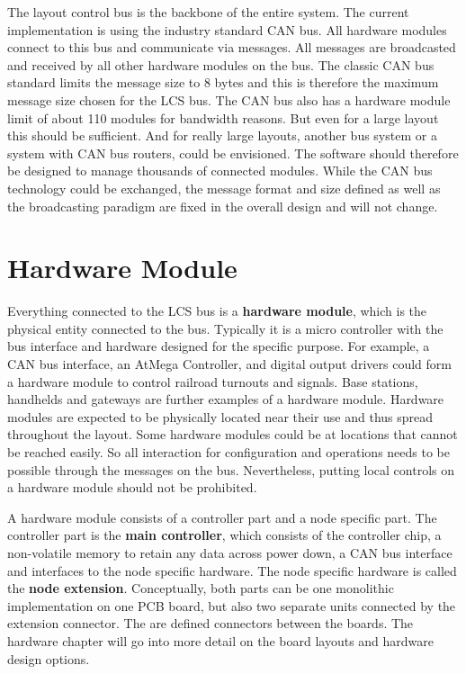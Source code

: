 The layout control bus is the backbone of the entire system. The current implementation is using the industry standard CAN bus. All hardware modules connect to this bus and communicate via messages. All messages are broadcasted and received by all other hardware modules on the bus. The classic CAN bus standard limits the message size to 8 bytes and this is therefore the maximum message size chosen for the LCS bus. The CAN bus also has a hardware module limit of about 110 modules for bandwidth reasons. But even for a large layout this should be sufficient. And for really large layouts, another bus system or a system with CAN bus routers, could be envisioned. The software should therefore be designed to manage thousands of connected modules. While the CAN bus technology could be exchanged, the message format and size defined as well as the broadcasting paradigm are fixed in the overall design and will not change.

\section{Hardware Module}

Everything connected to the LCS bus is a {\bf hardware module}, which is the physical entity connected to the bus. Typically it is a micro controller with the bus interface and hardware designed for the specific purpose. For example, a CAN bus interface, an AtMega Controller, and digital output drivers could form a hardware module to control railroad turnouts and signals. Base stations, handhelds and gateways are further examples of a hardware module. Hardware modules are expected to be physically located near their use and thus spread throughout the layout. Some hardware modules could be at locations that cannot be reached easily. So all interaction for configuration and operations needs to be possible through the messages on the bus. Nevertheless, putting local controls on a hardware module should not be prohibited.

A hardware module consists of a controller part and a node specific part. The controller part is the {\bf main controller}, which consists of the controller chip, a non-volatile memory to retain any data across power down, a CAN bus interface and interfaces to the node specific hardware. The node specific hardware is called the {\bf node extension}. Conceptually, both parts can be one monolithic implementation on one PCB board, but also two separate units connected by the extension connector. The are defined connectors between the boards. The hardware chapter will go into more detail on the board layouts and hardware design options.

